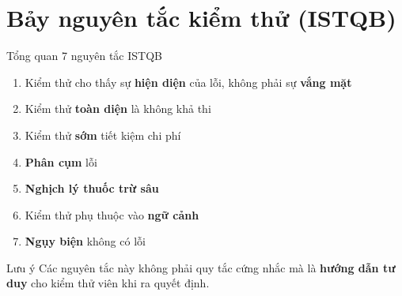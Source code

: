 \documentclass[aspectratio=169,12pt]{beamer}
\begin{document}
\section{Bảy nguyên tắc kiểm thử (ISTQB)}

\begin{frame}{Tổng quan 7 nguyên tắc ISTQB}
  \begin{enumerate}
    \item Kiểm thử cho thấy sự \textbf{hiện diện} của lỗi, không phải sự \textbf{vắng mặt}
    \item Kiểm thử \textbf{toàn diện} là không khả thi
    \item Kiểm thử \textbf{sớm} tiết kiệm chi phí
    \item \textbf{Phân cụm} lỗi
    \item \textbf{Nghịch lý thuốc trừ sâu}
    \item Kiểm thử phụ thuộc vào \textbf{ngữ cảnh}
    \item \textbf{Ngụy biện} không có lỗi
  \end{enumerate}

  \vspace{0.5em}
  \begin{block}{Lưu ý}
    Các nguyên tắc này không phải quy tắc cứng nhắc mà là \textbf{hướng dẫn tư duy}
    cho kiểm thử viên khi ra quyết định.
  \end{block}
\end{frame}
\end{document}
